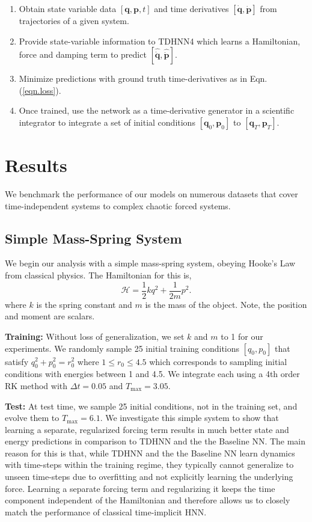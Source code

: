 \documentclass{article}
\begin{document}
\begin{enumerate}
\item Obtain state variable data $[\mathbf{q},\mathbf{p},t]$ and time derivatives $[\dot{\mathbf{q}},\dot{\mathbf{p}}]$ from trajectories of a given system.
\item Provide state-variable information to TDHNN4 which learns a Hamiltonian, force and damping term to predict $[\hat{\dot{\mathbf{q}}},\hat{\dot{\mathbf{p}}}]$.
\item Minimize predictions with ground truth time-derivatives as in Eqn.(\ref{eqn.loss}).
\item Once trained, use the network as a time-derivative generator in a scientific integrator to integrate a set of initial conditions $[\mathbf{q}_0,\mathbf{p}_0]$ to $[\mathbf{q}_T,\mathbf{p}_T]$.
\end{enumerate}


\section{Results}

We benchmark the performance of our models on numerous datasets that cover time-independent systems to complex chaotic forced systems. 

\subsection{Simple Mass-Spring System}

We begin our analysis with a simple mass-spring system, obeying Hooke's Law from classical physics. The Hamiltonian for this is,
\begin{equation}
\mathcal{H} = \frac{1}{2}kq^2 + \frac{1}{2m}p^2. 
\end{equation}
where $k$ is the spring constant and $m$ is the mass of the object. Note, the position and moment are scalars.

\textbf{Training:} Without loss of generalization, we set $k$ and $m$ to 1 for our experiments. We randomly sample 25 initial training conditions $[q_0,p_0]$ that satisfy $q_0^2+p_0^2 = r_0^2$ where $1 \leq r_0 \leq 4.5$ which corresponds to sampling initial conditions with energies between 1 and 4.5. We integrate each using a 4th order RK method with $\Delta t =0.05$ and $T_{\max} = 3.05$. 

\textbf{Test:} At test time, we sample 25 initial conditions, not in the training set, and evolve them to $T_{\max}=6.1$. We investigate this simple system to show that learning a separate, regularized forcing term results in much better state and energy predictions in comparison to TDHNN and the the Baseline NN. The main reason for this is that, while TDHNN and the the Baseline NN learn dynamics with time-steps within the training regime, they typically cannot generalize to unseen time-steps due to overfitting and not explicitly learning the underlying force. Learning a separate forcing term and regularizing it keeps the time component independent of the Hamiltonian and therefore allows us to closely match the performance of classical time-implicit HNN.
\end{document}
